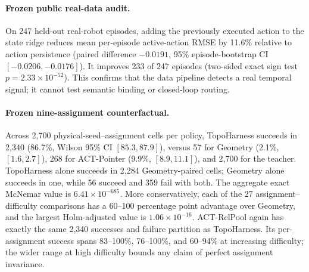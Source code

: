 \documentclass[journal]{IEEEtran}
\begin{document}
\begin{table}[t]
  \centering
  \caption{Episode-disjoint offline action prediction on the public real-robot
  Berkeley Cable Routing data.  These are not closed-loop success rates.}
  \label{tab:public-real}
    {{\small\setlength{\tabcolsep}{1.5pt}%
      }}
    {}
\end{table}

\paragraph{Frozen public real-data audit.}
On 247 held-out real-robot episodes, adding the previously executed action to
the state ridge reduces mean per-episode active-action RMSE by 11.6\% relative
to action persistence (paired difference $-0.0191$, 95\% episode-bootstrap CI
$[-0.0206,-0.0176]$).  It improves 233 of 247 episodes (two-sided exact sign
test $p=2.33\times10^{-52}$).  This confirms that the data pipeline detects a
real temporal signal; it cannot test semantic binding or closed-loop routing.

\begin{table}[!b]
  \centering
  \caption{Exact semantic counterfactual over nine assignments. Each policy
  observes identical physical states within a seed; only relation edges and the
  corresponding success predicate change.}
  \label{tab:counterfactual}
    {{\small\setlength{\tabcolsep}{2.5pt}%
      }}
    {}
\end{table}
\FloatBarrier

\paragraph{Frozen nine-assignment counterfactual.}
Across 2,700 physical-seed--assignment cells per policy, TopoHarness succeeds
in 2,340 (86.7\%, Wilson 95\% CI $[85.3,87.9]$), versus 57 for Geometry
(2.1\%, $[1.6,2.7]$), 268 for ACT-Pointer (9.9\%, $[8.9,11.1]$), and 2,700
for the teacher.  TopoHarness alone succeeds in 2,284 Geometry-paired cells;
Geometry alone succeeds in one, while 56 succeed and 359 fail with both.  The
aggregate exact McNemar value is $6.41\times10^{-685}$.  More conservatively,
each of the 27 assignment--difficulty comparisons has a 60--100 percentage
point advantage over Geometry, and the largest Holm-adjusted value is
$1.06\times10^{-16}$.  ACT-RelPool again has exactly the same 2,340 successes
and failure partition as TopoHarness.  Its per-assignment success spans
83--100\%, 76--100\%, and 60--94\% at increasing difficulty; the wider range
at high difficulty bounds any claim of perfect assignment invariance.
\end{document}
